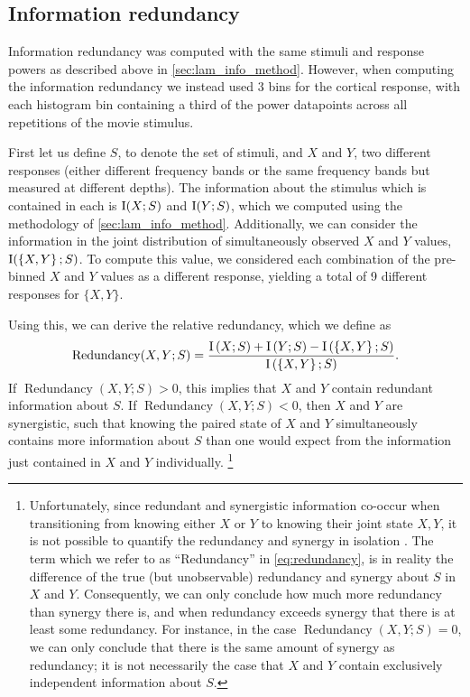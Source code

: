 \subsection{Information redundancy}
\label{sec:lam_redundancy_method}

Information redundancy was computed with the same stimuli and response powers as described above in \autoref{sec:lam_info_method}.
However, when computing the information redundancy we instead used \num{3} bins for the cortical response, with each histogram bin containing a third of the power datapoints across all repetitions of the movie stimulus.

First let us define $S$, to denote the set of stimuli, and $X$ and $Y$, two different responses (either different frequency bands or the same frequency bands but measured at different depths).
The information about the stimulus which is contained in each is $\operatorname{I}(X;S)$ and $\operatorname{I}(Y;S)$, which we computed using the methodology of \autoref{sec:lam_info_method}.
Additionally, we can consider the information in the joint distribution of simultaneously observed $X$ and $Y$ values, $\operatorname{I}(\left\{X,Y\right\};S)$.
To compute this value, we considered each combination of the pre-binned $X$ and $Y$ values as a different response, yielding a total of \num{9} different responses for $\{X,Y\}$.

Using this, we can derive the relative redundancy, which we define as
\begin{equation}
\label{eq:redundancy}
\operatorname{Redundancy}(X,Y;S)=\frac{
\operatorname{I}\left(X;S\right) + \operatorname{I}\left(Y;S\right) - \operatorname{I}\left(\left\{X,Y\right\};S\right)
}{
\operatorname{I}\left(\left\{X,Y\right\};S\right)
}
.\end{equation}
If $\operatorname{Redundancy}\left(X,Y;S\right) > 0$, this implies that $X$ and $Y$ contain redundant information about $S$.
If $\operatorname{Redundancy}\left(X,Y;S\right) < 0$, then $X$ and $Y$ are synergistic, such that knowing the paired state of $X$ and $Y$ simultaneously contains more information about $S$ than one would expect from the information just contained in $X$ and $Y$ individually.%
\footnote{%
\label{foot:redundancy_synergy}%
Unfortunately, since redundant and synergistic information co-occur when transitioning from knowing either $X$ or $Y$ to knowing their joint state ${X,Y}$, it is not possible to quantify the redundancy and synergy in isolation \citep{Latham2005,Averbeck2006,Williams2010,Griffith2014,Banerjee2015}.
The term which we refer to as ``Redundancy'' in \autoref{eq:redundancy}, is in reality the difference of the true (but unobservable) redundancy and synergy about $S$ in $X$ and $Y$.
Consequently, we can only conclude how much more redundancy than synergy there is, and when redundancy exceeds synergy that there is at least some redundancy.
For instance, in the case $\operatorname{Redundancy}\left(X,Y;S\right) = 0$, we can only conclude that there is the same amount of synergy as redundancy; it is not necessarily the case that $X$ and $Y$ contain exclusively independent information about $S$.
}

